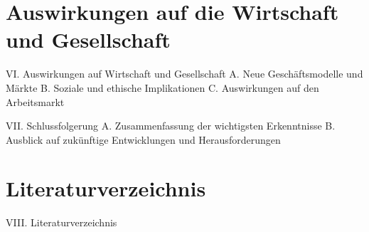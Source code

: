 \documentclass[journal]{IEEEtran}
\begin{document}
\begin{onecolumn}
\section*{Auswirkungen auf die Wirtschaft und Gesellschaft}
VI. Auswirkungen auf Wirtschaft und Gesellschaft
A. Neue Geschäftsmodelle und Märkte
B. Soziale und ethische Implikationen
C. Auswirkungen auf den Arbeitsmarkt

VII. Schlussfolgerung
A. Zusammenfassung der wichtigsten Erkenntnisse
B. Ausblick auf zukünftige Entwicklungen und Herausforderungen

\section*{Literaturverzeichnis}
VIII. Literaturverzeichnis


\end{onecolumn}
\end{document}
